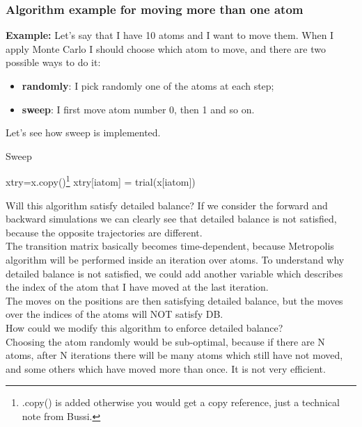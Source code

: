 \subsubsection{Algorithm example for moving more than one atom}
\textbf{Example: }Let's say that I have 10 atoms and I want to move them. When I apply Monte Carlo I should choose which atom to move, and there are two possible ways to do it:
\begin{itemize}
\item \textbf{randomly}: I pick randomly one of the atoms at each step;
\item \textbf{sweep}: I first move atom number 0, then 1 and so on.
\end{itemize}
Let's see how sweep is implemented.\\
\begin{minipage}{\textwidth}
\renewcommand*\footnoterule{}
\begin{savenotes}
\begin{algorithm}[H]\label{sweep}
			\caption{Sweep}
			\begin{algorithmic}[0]
						\State xtry=x.copy()\footnote{.copy() is added otherwise you would get a copy reference, just a technical note from Bussi.}
						\State xtry[iatom] = trial(x[iatom])
						\State [...]
						\State [Metropolis]
						\State [...]
					\EndFor
				\EndFor
				
			\end{algorithmic}
		\end{algorithm}
\end{savenotes}
\end{minipage}
Will this algorithm satisfy detailed balance? If we consider the forward and backward simulations we can clearly see that detailed balance is not satisfied, because the opposite trajectories are different.\\
The transition matrix basically becomes time-dependent, because Metropolis algorithm will be performed inside an iteration over atoms.
To understand why detailed balance is not satisfied, we could add another variable which describes the index of the atom that I have moved at the last iteration.\\
The moves on the positions are then satisfying detailed balance, but the moves over the indices of the atoms will NOT satisfy DB.\\
How could we modify this algorithm to enforce detailed balance?\\
Choosing the atom randomly would be sub-optimal, because if there are N atoms, after N iterations there will be many atoms which still have not moved, and some others which have moved more than once. It is not very efficient.\\
